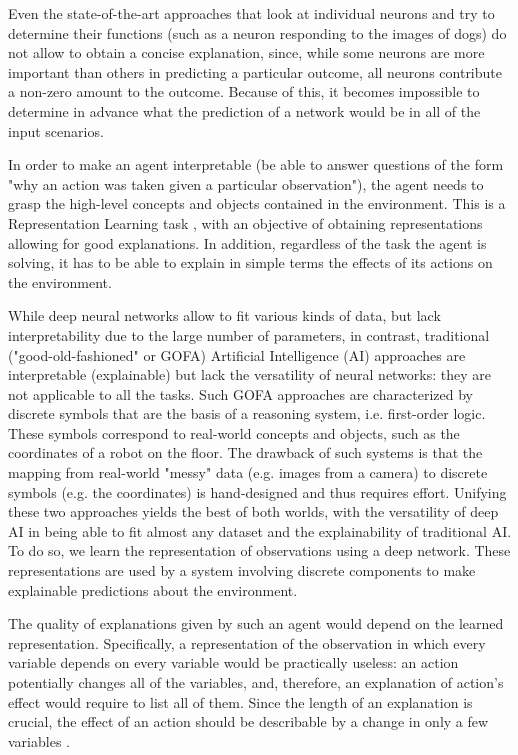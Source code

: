\documentclass[a4paper,11pt,oneside]{report}
\begin{document}
Even the state-of-the-art approaches that look at individual neurons and try to determine their functions (such as a neuron responding to the images of dogs) do not allow to obtain a concise explanation, since, while some neurons are more important than others in predicting a particular outcome, all neurons contribute a non-zero amount to the outcome. Because of this, it becomes impossible to determine in advance what the prediction of a network would be in all of the input scenarios.

In order to make an agent interpretable (be able to answer questions of the form "why an action was taken given a particular observation"), the agent needs to grasp the high-level concepts and objects contained in the environment. This is a Representation Learning task \cite{Bengio2007,Learning2014,Deng}, with an objective of obtaining representations allowing for good explanations. In addition, regardless of the task the agent is solving, it has to be able to explain in simple terms the effects of its actions on the environment.

While deep neural networks allow to fit various kinds of data, but lack interpretability due to the large number of parameters, in contrast, traditional ("good-old-fashioned" or GOFA) Artificial Intelligence (AI) approaches are interpretable (explainable) but lack the versatility of neural networks: they are not applicable to all the tasks.
Such GOFA approaches are characterized by discrete symbols that are the basis of a reasoning system, i.e. first-order logic.
These symbols correspond to real-world concepts and objects, such as the coordinates of a robot on the floor.
The drawback of such systems is that the mapping from real-world "messy" data (e.g. images from a camera) to discrete symbols (e.g. the coordinates) is hand-designed and thus requires effort.
Unifying these two approaches yields the best of both worlds, with the versatility of deep AI in being able to fit almost any dataset and the explainability of traditional AI.
To do so, we learn the representation of observations using a deep network. These representations are used by a system involving discrete components to make explainable predictions about the environment.

The quality of explanations given by such an agent would depend on the learned representation. Specifically, a representation of the observation in which every variable depends on every variable would be practically useless: an action potentially changes all of the variables, and, therefore, an explanation of action's effect would require to list all of them. Since the length of an explanation is crucial, the effect of an action should be describable by a change in only a few variables \cite{Schmidhuber2009}.
\end{document}
